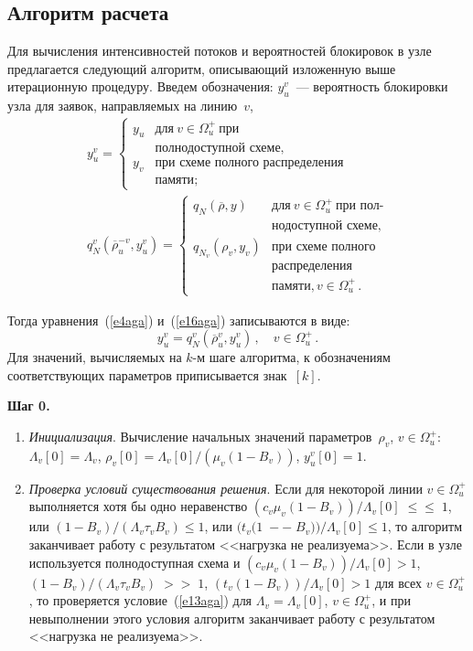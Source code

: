\begin{multicols}{2}
\section{Алгоритм расчета} %

    Для вычисления интенсивностей потоков и вероятностей блокировок в 
узле предлагается следующий алгоритм, описывающий изложенную выше 
итерационную процедуру. Введем обозначения:
$y_u^v$~--- вероятность блокировки узла для заявок, направляемых на 
линию~$v$,
\begin{gather*}
y_u^v  = 
\begin{cases}
y_u & \mbox{для}\ v\in\Omega_u^+\ \mbox{при}\\
&\mbox{полнодоступной схеме},\\
y_v & \mbox{при схеме полного распределения}\\
&\mbox{памяти};
\end{cases}
\\
q_N^v(\overline{\rho}_u^{-v}, y_u^v)  = 
\begin{cases}
q_N(\overline{\rho},y) & \mbox{для}\ v\in\Omega_u^+\ \mbox{при пол-}\\ 
&\mbox{нодоступной схеме},\\
q_{N_v}(\rho_v, y_v) & \mbox{при схеме полного}\\
&\mbox{распределения}\\ 
&\mbox{памяти},  v\in\Omega_u^+\,.
\end{cases}
\end{gather*}



Тогда уравнения~(\ref{e4aga}) и~(\ref{e16aga}) записываются в виде:
$$
y_u^v = q_N^v (\overline{\rho}^v_u, y^v_u)\,,\quad v\in \Omega_u^+\,.
$$
Для значений, вычисляемых на $k$-м шаге алгоритма, к 
обозначениям соответствующих параметров приписывается знак~$[k]$.
\pagebreak

\textbf{Шаг 0.} 
\begin{enumerate}[1.]
\item  \textit{Инициализация}. Вычисление начальных значений 
параметров~$\rho_v$, $v\in\Omega_u^+$: $\Lambda_v[0]=\Lambda_v$, 
$\rho_v[0]=\Lambda_v[0]/(\mu_v(1-B_v))$, $y_u^v[0]=1$.
\item \textit{Проверка условий существования решения}. Если для некоторой 
линии $v\in\Omega_u^+$ выполняется хотя бы одно неравенство $(c_v\mu_v(1-
B_v))/\Lambda_v[0]\;\leq$\linebreak $\leq\;1$, или $(1-B_v)/(\Lambda_v\tau_v B_v) \leq 1$, или 
$(t_v(1\;-$\linebreak $-\;B_v))/\Lambda_v[0] \leq 1$, то алгоритм заканчивает работу с 
результатом <<нагрузка не реализуема>>. Если в узле используется 
полнодоступная схема и $(c_v\mu_v(1-B_v))/\Lambda_v[0] > 1$, $(1-
B_v)/(\Lambda_v\tau_v B_v)\;>$\linebreak $>\;1$, $(t_v(1-B_v))/\Lambda_v[0] > 1$ для всех 
$v\in\Omega_u^+$, то проверяется условие~(\ref{e13aga}) для $\Lambda_v =
\Lambda_v[0]$, $v\in\Omega_u^+$, и при невыполнении этого условия алгоритм 
заканчивает работу с результатом <<нагрузка не реализуема>>.
\end{enumerate}


\end{multicols}
